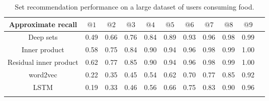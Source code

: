 \begin{table}[!htbp]
\centering
\begin{tabular}{ccccccccccc}
\toprule
Approximate recall & $@1$ & $@2$ & $@3$ & $@4$ & $@5$ & $@6$ & $@7$ & $@8$ & $@9$ \\
\midrule
Deep sets & 0.49 & 0.66 & 0.76 & 0.84 & 0.89 & 0.93 & 0.96 & 0.98 & 0.99 \\
Inner product & 0.58 & 0.75 & 0.84 & 0.90 & 0.94 & 0.96 & 0.98 & 0.99 & 1.00 \\
Residual inner product & 0.62 & 0.77 & 0.85 & 0.90 & 0.94 & 0.96 & 0.98 & 0.99 & 1.00 \\
word2vec & 0.22 & 0.35 & 0.45 & 0.54 & 0.62 & 0.70 & 0.77 & 0.85 & 0.92 \\
LSTM & 0.19 & 0.33 & 0.46 & 0.56 & 0.66 & 0.75 & 0.83 & 0.90 & 0.96 \\

\bottomrule\\
\end{tabular}
\caption{Set recommendation performance on a large dataset of users consuming
food.}
\label{tab:results}
\end{table}
